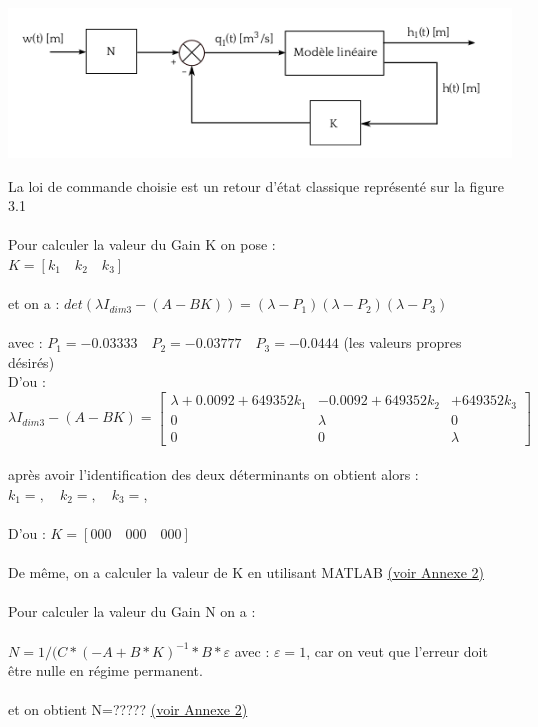 \begin{center}
\includegraphics[scale=0.7]{fig2.png}
\label{fig2} 
\end{center}

La loi de commande choisie est un retour d'état classique représenté sur la figure 3.1 \\\\


Pour calculer la valeur du Gain K on pose :\\

$K=[k_{1}\quad k_{2} \quad k_{3}]$\\\\
et on a : 
$det(\lambda I_{dim3}-(A-BK))=(\lambda-P_{1})(\lambda-P_{2})(\lambda-P_{3})$\\\\

avec : $P_{1}=-0.03333 \quad P_{2}=-0.03777 \quad P_{3}=-0.0444$ (les valeurs propres désirés)\\

D'ou :\\
$\lambda I_{dim3}-(A-BK)=\begin{bmatrix} 
\lambda+0.0092+649352k_{1} & -0.0092+649352k_{2} & +649352k_{3} \\
0 & \lambda & 0 \\
0 & 0 & \lambda  
\end{bmatrix} $\\\\
 
après avoir l'identification des deux déterminants on obtient alors :\\

$k_{1}=  ,\quad k_{2}=  ,\quad k_{3}=  $, \\\\

D'ou : $K=[000 \quad 000  \quad 000]$\\\\

De même, on a calculer la valeur de K en utilisant MATLAB \hyperref[section1.2]{(voir Annexe 2)}\label{annexe2}\\\\

Pour calculer la valeur du Gain N on a :\\\\

$N=1/(C*(-A+B*K)^{-1}*B*\varepsilon $ \quad avec : $\varepsilon=1$, car on veut que l'erreur doit être nulle en régime permanent. \\\\

et on obtient N=????? \quad \hyperref[section1.2]{(voir Annexe 2)}\label{annexe2}\\\\




    






